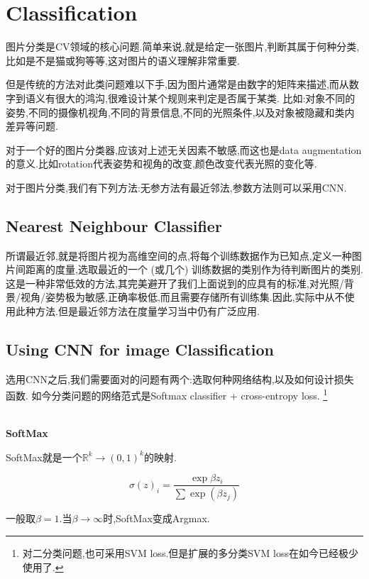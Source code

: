\section{Classification}

图片分类是CV领域的核心问题.简单来说,就是给定一张图片,判断其属于何种分类,比如是不是猫或狗等等,这对图片的语义理解非常重要.

但是传统的方法对此类问题难以下手,因为图片通常是由数字的矩阵来描述,而从数字到语义有很大的鸿沟,很难设计某个规则来判定是否属于某类.
比如:对象不同的姿势,不同的摄像机视角,不同的背景信息,不同的光照条件,以及对象被隐藏和类内差异等问题.

对于一个好的图片分类器,应该对上述无关因素不敏感,而这也是data augmentation的意义.比如rotation代表姿势和视角的改变,颜色改变代表光照的变化等.

对于图片分类,我们有下列方法:无参方法有最近邻法,参数方法则可以采用CNN.

\subsection{Nearest Neighbour Classifier}

所谓最近邻,就是将图片视为高维空间的点,将每个训练数据作为已知点,定义一种图片间距离的度量,选取最近的一个 (或几个)
训练数据的类别作为待判断图片的类别.这是一种非常低效的方法,其完美避开了我们上面说到的应具有的标准,对光照/背景/视角/姿势极为敏感,正确率极低,而且需要存储所有训练集.因此,实际中从不使用此种方法.但是最近邻方法在度量学习当中仍有广泛应用.

\subsection{Using CNN for image Classification}

选用CNN之后,我们需要面对的问题有两个:选取何种网络结构,以及如何设计损失函数.
如今分类问题的网络范式是Softmax classifier + cross-entropy loss.
\footnote{对二分类问题,也可采用SVM loss.但是扩展的多分类SVM loss在如今已经极少使用了.}

\textbf{\\SoftMax}

SoftMax就是一个${\mathbb R}^k \to {(0, 1)}^k$的映射.

\begin{equation}
	\sigma(z)_i = \frac{\exp{\beta z_i}}{\sum \exp(\beta z_j)}
\end{equation}

一般取$\beta = 1.$当$\beta \to \infty$时,SoftMax变成Argmax.

